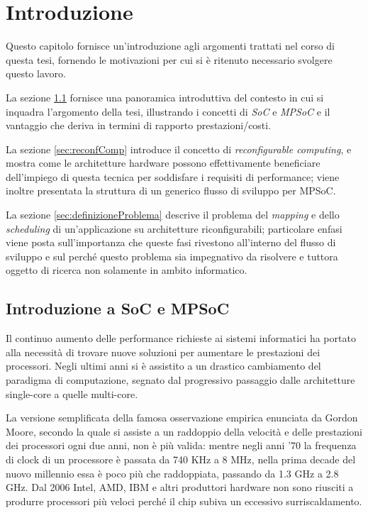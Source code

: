 \chapter{Introduzione}
\label{chap:intro}
\vspace{1cm}
Questo capitolo fornisce un'introduzione agli argomenti trattati nel corso di questa
tesi, fornendo le motivazioni per cui si \`e ritenuto necessario svolgere questo
lavoro.

La sezione \ref{sec:introSoC} fornisce una panoramica introduttiva del contesto in cui si
inquadra l'argomento della tesi, illustrando i concetti di \emph{\acl{SoC}} e
\emph{\acl{MPSoC}} e il vantaggio che deriva in termini di rapporto prestazioni/costi.

La sezione \ref{sec:reconfComp} introduce il concetto di \emph{reconfigurable computing},
e mostra come le architetture hardware possono effettivamente beneficiare dell'impiego
di questa tecnica per soddisfare i requisiti di performance; viene inoltre presentata
la struttura di un generico flusso di sviluppo per \acs{MPSoC}.

La sezione \ref{sec:definizioneProblema} descrive il problema del \emph{mapping} e dello
\emph{scheduling} di un'applicazione su architetture riconfigurabili; particolare
enfasi viene posta sull'importanza che queste fasi rivestono all'interno del
flusso di sviluppo e sul perch\'e questo problema sia impegnativo da risolvere
e tuttora oggetto di ricerca non solamente in ambito informatico.

\newpage

\section[Introduzione a \acs{SoC} e \ac{MPSoC}]{Introduzione a \acs{SoC} e \ac{MPSoC}}
\label{sec:introSoC}
Il continuo aumento delle performance richieste ai sistemi informatici ha portato alla necessit\`a
di trovare nuove soluzioni per aumentare le prestazioni dei processori. Negli ultimi anni si \`e
assistito a un drastico cambiamento del paradigma di computazione, segnato dal progressivo passaggio
dalle architetture single-core a quelle multi-core.

La versione semplificata della famosa osservazione empirica enunciata da Gordon Moore, secondo la quale
si assiste a un raddoppio della velocit\`a e delle prestazioni dei processori ogni due anni, non \`e
pi\`u valida: mentre negli anni '70 la frequenza di clock di un processore \`e passata da 740 KHz a
8 MHz, nella prima decade del nuovo millennio essa \`e poco pi\`u che raddoppiata, passando da 1.3 GHz
a 2.8 GHz. Dal 2006 Intel, AMD, IBM e altri produttori hardware non sono riusciti a produrre
processori pi\`u veloci perch\'e il chip subiva un eccessivo surriscaldamento.

